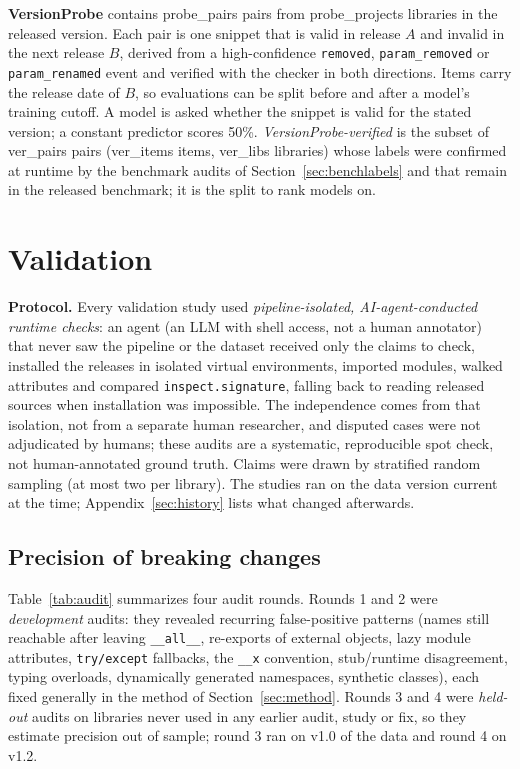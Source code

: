 \documentclass[10pt,twocolumn,letterpaper]{article}
\begin{document}
\textbf{VersionProbe} contains {{probe_pairs}} pairs from {{probe_projects}} libraries in the released version. Each pair is one snippet
that is valid in release $A$ and invalid in the next release $B$, derived from a high-confidence
\texttt{removed}, \texttt{param\_removed} or \texttt{param\_renamed} event and verified with the checker in both
directions. Items carry the release date of $B$, so evaluations can be split before and after a model's training
cutoff. A model is asked whether the snippet is valid for the stated version; a constant predictor scores 50\%.
\emph{VersionProbe-verified} is the subset of {{ver_pairs}} pairs ({{ver_items}} items, {{ver_libs}} libraries) whose
labels were confirmed at runtime by the benchmark audits of Section~\ref{sec:benchlabels} and that remain in the
released benchmark; it is the split to rank models on.

\section{Validation}\label{sec:validation}
\textbf{Protocol.} Every validation study used \emph{pipeline-isolated, AI-agent-conducted runtime checks}: an agent
(an LLM with shell access, not a human annotator) that never saw the pipeline or the dataset received only the claims
to check, installed the releases in isolated virtual environments, imported modules, walked attributes and compared
\texttt{inspect.signature}, falling back to reading released sources when installation was impossible. The
independence comes from that isolation, not from a separate human researcher, and disputed cases were not
adjudicated by humans; these audits are a systematic, reproducible spot check, not human-annotated ground truth.
Claims were drawn by stratified random sampling (at most two per library). The studies ran on the data version current
at the time; Appendix~\ref{sec:history} lists what changed afterwards.

\subsection{Precision of breaking changes}
Table~\ref{tab:audit} summarizes four audit rounds. Rounds 1 and 2 were \emph{development} audits: they revealed
recurring false-positive patterns (names still reachable after leaving \texttt{\_\_all\_\_}, re-exports of external
objects, lazy module attributes, \texttt{try/except} fallbacks, the \texttt{\_\_x} convention, stub/runtime
disagreement, typing overloads, dynamically generated namespaces, synthetic classes), each fixed generally in the
method of Section~\ref{sec:method}. Rounds 3 and 4 were \emph{held-out} audits on libraries never used in any earlier
audit, study or fix, so they estimate precision out of sample; round 3 ran on v1.0 of the data and round 4 on v1.2.
\end{document}
